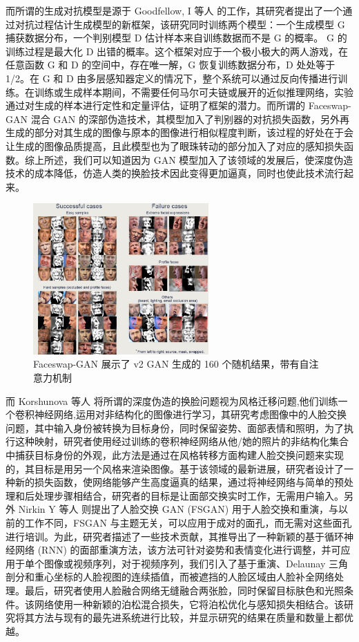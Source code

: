 而所谓的生成对抗模型是源于 Goodfellow, I 等人 \cite{goodfellow2014generative}的工作，其研究者提出了一个通过对抗过程估计生成模型的新框架，该研究同时训练两个模型：一个生成模型 G 捕获数据分布，一个判别模型 D 估计样本来自训练数据而不是 G 的概率。 G 的训练过程是最大化 D 出错的概率。这个框架对应于一个极小极大的两人游戏，在任意函数 G 和 D 的空间中，存在唯一解，G 恢复训练数据分布，D 处处等于 1/2。在 G 和 D 由多层感知器定义的情况下，整个系统可以通过反向传播进行训练。在训练或生成样本期间，不需要任何马尔可夫链或展开的近似推理网络，实验通过对生成的样本进行定性和定量评估，证明了框架的潜力。而所谓的  Faceswap-GAN 混合 GAN 的深部伪造技术，其模型加入了判别器的对抗损失函数，另外再生成的部分对其生成的图像与原本的图像进行相似程度判断，该过程的好处在于会让生成的图像品质提高，且此模型也为了眼珠转动的部分加入了对应的感知损失函数。综上所述，我们可以知道因为 GAN 模型加入了该领域的发展后，使深度伪造技术的成本降低，仿造人类的换脸技术因此变得更加逼真，同时也使此技术流行起来。

\begin{figure}[htb]
\centering 
\includegraphics[width=0.60\textwidth]{img/ch1m9.png} 
\caption{Faceswap-GAN 展示了 v2 GAN 生成的 160 个随机结果，带有自注意力机制}
\label{Test}
\end{figure}

而 Korshunova 等人\cite{korshunova2017fast} 将所谓的深度伪造的换脸问题视为风格迁移问题,他们训练一个卷积神经网络,运用对非结构化的图像进行学习，其研究考虑图像中的人脸交换问题，其中输入身份被转换为目标身份，同时保留姿势、面部表情和照明，为了执行这种映射，研究者使用经过训练的卷积神经网络从他/她的照片的非结构化集合中捕获目标身份的外观，此方法是通过在风格转移方面构建人脸交换问题来实现的，其目标是用另一个风格来渲染图像。基于该领域的最新进展，研究者设计了一种新的损失函数，使网络能够产生高度逼真的结果，通过将神经网络与简单的预处理和后处理步骤相结合，研究者的目标是让面部交换实时工作，无需用户输入。另外 Nirkin Y 等人 \cite{nirkin2019fsgan}则提出了人脸交换 GAN (FSGAN) 用于人脸交换和重演，与以前的工作不同，FSGAN 与主题无关，可以应用于成对的面孔，而无需对这些面孔进行培训。为此，研究者描述了一些技术贡献，其推导出了一种新颖的基于循环神经网络 (RNN) 的面部重演方法，该方法可针对姿势和表情变化进行调整，并可应用于单个图像或视频序列，对于视频序列，我们引入了基于重演、Delaunay 三角剖分和重心坐标的人脸视图的连续插值，而被遮挡的人脸区域由人脸补全网络处理。最后，研究者使用人脸融合网络无缝融合两张脸，同时保留目标肤色和光照条件。该网络使用一种新颖的泊松混合损失，它将泊松优化与感知损失相结合。该研究将其方法与现有的最先进系统进行比较，并显示研究的结果在质量和数量上都优越。

